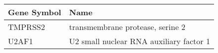 \begin{tabular}{ll}
\toprule
Gene Symbol &                                    Name \\
\midrule
    TMPRSS2 &        transmembrane protease, serine 2 \\
      U2AF1 & U2 small nuclear RNA auxiliary factor 1 \\
\bottomrule
\end{tabular}
